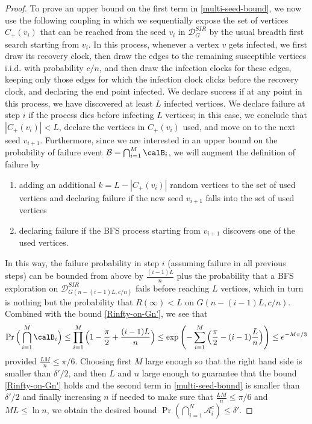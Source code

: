 \documentclass[11pt]{article}
\begin{document}
\begin{proof}
To prove an upper bound on the first term in \eqref{multi-seed-bound}, we now use the following coupling in which we sequentially expose the set of vertices
$C_+(v_i)$ that can be reached from the seed $v_i$ 
in $\mathcal D_G^{SIR}$ by the usual breadth first search starting from $v_i$. In this process, whenever a vertex $v$ gets infected, we first draw its recovery clock, then draw the edges to the remaining susceptible vertices i.i.d. with probability $c/n$, and then draw the infection clocks for these edges, keeping only those edges for which the infection clock clicks before the recovery clock, and declaring the end point infected. We declare success if at any point in this process, we have discovered at least $L$ infected vertices. We declare failure at step $i$ if the process dies before infecting $L$ vertices; in this case, we conclude that $|C_+(v_i)|<L$, declare the vertices in $C_+(v_i)$ used, and move on to the next seed $v_{i+1}$. Furthermore, since we are interested in an upper bound on the probability of failure event 
$\mathcal B=\bigcap_{i=1}^M \calB_i$, we will augment the definition of failure by
\begin{enumerate}
    \item adding an additional $k=L-|C_+(v_i)|$ random vertices to the set of used vertices and declaring failure if the new seed $v_{i+1}$ falls into the set of used vertices
    \item declaring failure if the BFS process starting from $v_{i+1}$ discovers one of the used vertices.
\end{enumerate}
In this way, the failure probability in step $i$ (assuming failure in all previous steps) can be bounded from above by $\frac{(i-1)L}n$ plus the probability that a BFS exploration on $\mathcal D^{SIR}_{G(n-(i-1)L,c/n)}$ fails before reaching $L$ vertices, which in turn is nothing but the probability that $R(\infty)<L$ on $G(n-(i-1)L,c/n)$.
Combined with the bound \eqref{Rinfty-on-Gn'}, we see that
$$\Pr\Big(\bigcap_{i=1}^M \calB_i\Big)\leq \prod_{i=1}^M\Big(1-\frac\pi 2+\frac{(i-1)L}n\Big)\leq \exp\left(-\sum_{i=1}^M\Big(\frac\pi 2- (i-1)\frac Ln\Big)\right)\leq e^{-M\pi/3}
$$
provided $\frac{LM}n\leq \pi /6$.
Choosing first $M$ large enough so that the right hand side is smaller than $\delta'/2$, and then $L$ and $n$ large enough to guarantee that the bound \eqref{Rinfty-on-Gn'} holds and
the second term in \eqref{multi-seed-bound} is smaller than $\delta'/2$ and finally increasing $n$ if needed to make sure that $\frac{LM}n\leq \pi /6$ and $ML\leq \ln n$, we obtain the desired bound $\Pr(\bigcap_{i=1}^N \mathcal{A}_i^c) \le \delta'$.
\end{proof}
\end{document}
